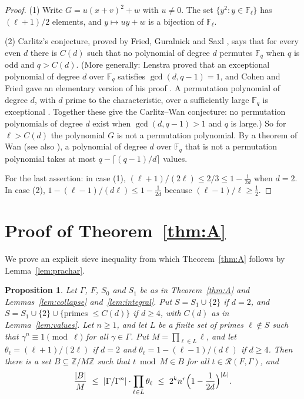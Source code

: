 \documentclass[11pt]{amsart}
\newtheorem{proposition}[lemma]{Proposition}
\theoremstyle{definition}
\theoremstyle{remark}
\newcommand{\Z}{\mathbb{Z}}
\newcommand{\F}{\mathbb{F}}
\newcommand{\R}{\mathcal{R}}
\begin{document}
\begin{proof}
(1) Write $G=u(x+v)^2+w$ with $u\ne0$.
The set $\{y^2:y\in\F_\ell\}$ has $(\ell+1)/2$ elements, and $y\mapsto uy+w$ is a bijection of $\F_\ell$.

(2) Carlitz's conjecture, proved by Fried, Guralnick and Saxl \cite{FGS93}, says that for every even $d$ there is $C(d)$ such that no polynomial of degree $d$ permutes $\F_q$ when $q$ is odd and $q>C(d)$.
(More generally: Lenstra proved that an exceptional polynomial of degree $d$ over $\F_q$ satisfies $\gcd(d,q-1)=1$, and Cohen and Fried gave an elementary version of his proof \cite{CF95}. A permutation polynomial of degree $d$, with $d$ prime to the characteristic, over a sufficiently large $\F_q$ is exceptional \cite{vzG91}. Together these give the Carlitz--Wan conjecture: no permutation polynomials of degree $d$ exist when $\gcd(d,q-1)>1$ and $q$ is large.)
So for $\ell>C(d)$ the polynomial $G$ is not a permutation polynomial.
By a theorem of Wan \cite{Wan93} (see also \cite[Theorem~3.1]{WSC93}), a polynomial of degree $d$ over $\F_q$ that is not a permutation polynomial takes at most $q-\lceil(q-1)/d\rceil$ values.

For the last assertion: in case (1), $(\ell+1)/(2\ell)\le2/3\le1-\frac1{2d}$ when $d=2$.
In case (2), $1-(\ell-1)/(d\ell)\le1-\frac1{2d}$ because $(\ell-1)/\ell\ge\frac12$.
\end{proof}

\section{Proof of Theorem~\ref{thm:A}}\label{sec:proofA}

We prove an explicit sieve inequality from which Theorem~\ref{thm:A} follows by Lemma~\ref{lem:prachar}.

\begin{proposition}\label{prop:explicit}
Let $\Gamma$, $F$, $S_0$ and $S_1$ be as in Theorem~\ref{thm:A} and Lemmas~\ref{lem:collapse} and~\ref{lem:integral}.
Put $S=S_1\cup\{2\}$ if $d=2$, and $S=S_1\cup\{2\}\cup\{\text{primes }\le C(d)\}$ if $d\ge4$, with $C(d)$ as in Lemma~\ref{lem:values}.
Let $n\ge1$, and let $L$ be a finite set of primes $\ell\notin S$ such that $\gamma^n\equiv1\pmod\ell$ for all $\gamma\in\Gamma$.
Put $M=\prod_{\ell\in L}\ell$, and let $\theta_\ell=(\ell+1)/(2\ell)$ if $d=2$ and $\theta_\ell=1-(\ell-1)/(d\ell)$ if $d\ge4$.
Then there is a set $B\subseteq\Z/M\Z$ such that $t\bmod M\in B$ for all $t\in\R(F,\Gamma)$, and
\[
\frac{|B|}{M}\ \le\ |\Gamma/\Gamma^n|\cdot\prod_{\ell\in L}\theta_\ell\ \le\ 2^kn^r\Bigl(1-\frac1{2d}\Bigr)^{|L|}.
\]
\end{proposition}
\end{document}
